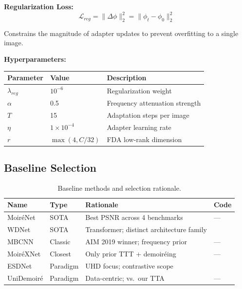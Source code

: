\documentclass[10pt,twocolumn,letterpaper]{article}
\begin{document}
\textbf{Regularization Loss:}
\begin{equation}
\mathcal{L}_{reg} = \|\Delta\phi\|_2^2 = \|\phi_t - \phi_0\|_2^2
\end{equation}

Constrains the magnitude of adapter updates to prevent overfitting to a single image.

\textbf{Hyperparameters:}
\begin{center}
\footnotesize
\begin{tabular}{@{}lll@{}}
\toprule
Parameter & Value & Description \\
\midrule
$\lambda_{reg}$ & $10^{-6}$ & Regularization weight \\
$\alpha$ & 0.5 & Frequency attenuation strength \\
$T$ & 15 & Adaptation steps per image \\
$\eta$ & $1 \times 10^{-4}$ & Adapter learning rate \\
$r$ & $\max(4, C/32)$ & FDA low-rank dimension \\
\bottomrule
\end{tabular}
\end{center}

\subsection{Baseline Selection}

\begin{table}[tbp]
\centering
\footnotesize
\caption{Baseline methods and selection rationale.}
\label{tab:baseline}
\setlength{\tabcolsep}{3pt}
\begin{tabular}{@{}p{1.3cm}p{1.1cm}p{2.8cm}p{0.9cm}@{}}
\toprule
Name & Type & Rationale & Code \\
\midrule
Moir\'{e}Net \cite{anonymous2025moirenet} & SOTA & Best PSNR across 4 benchmarks & --- \\
WDNet \cite{liu2020wavelet} & SOTA & Transformer; distinct architecture family & \cite{liu2020wavelet} \\
MBCNN \cite{zheng2022learning} & Classic & AIM 2019 winner; frequency prior & --- \\
Moir\'{e}XNet \cite{li2025moirexnet} & Closest & Only prior TTT + demoir\'{e}ing & --- \\
ESDNet \cite{yu2022towards} & Paradigm & UHD focus; contrastive scope & \cite{yu2022towards} \\
UniDemoir\'{e} \cite{yang2025unidemoire} & Paradigm & Data-centric; vs.\ our TTA & --- \\
\bottomrule
\end{tabular}
\end{table}
\end{document}
